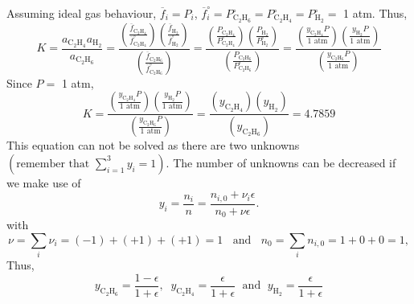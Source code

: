 \documentclass[12pts,a4paper,amsmath,amssymb,floatfix]{article}%
\newcommand{\frc}{\displaystyle\frac}
\newcommand{\summation}[3][error]{\sum\limits_{#2}^{#3}#1}
\begin{document}
\begin{enumerate}[1)]
\begin{displaymath}
         \end{displaymath}
         Assuming ideal gas behaviour, $\overline{f}_{i}=P_{i}$, $\overline{f}_{i}^{\circ}=P^{\circ}_{\text{C}_{2}\text{H}_{6}}=P^{\circ}_{\text{C}_{2}\text{H}_{4}}=P^{\circ}_{\text{H}_{2}}=$ 1 atm. Thus,
         \begin{displaymath}
            K = \frc{a_{\text{C}_{2}\text{H}_{4}}a_{\text{H}_{2}}}{a_{\text{C}_{2}\text{H}_{6}}} = \frc{\left(\frc{\overline{f}_{\text{C}_{2}\text{H}_{4}}}{\overline{f}^{\circ}_{\text{C}_{2}\text{H}_{4}}}\right)\left(\frc{\overline{f}_{\text{H}_{2}}}{\overline{f}^{\circ}_{\text{H}_{2}}}\right)}{\left(\frc{\overline{f}_{\text{C}_{2}\text{H}_{6}}}{\overline{f}^{\circ}_{\text{C}_{2}\text{H}_{6}}}\right)} = \frc{\left(\frc{P_{\text{C}_{2}\text{H}_{4}}}{P^{\circ}_{\text{C}_{2}\text{H}_{4}}}\right)\left(\frc{P_{\text{H}_{2}}}{P^{\circ}_{\text{H}_{2}}}\right)}{\left(\frc{P_{\text{C}_{2}\text{H}_{6}}}{P^{\circ}_{\text{C}_{2}\text{H}_{6}}}\right)} = \frc{\left(\frc{y_{\text{C}_{2}\text{H}_{4}}P}{1\text{ atm}}\right)\left(\frc{y_{\text{H}_{2}}P}{1\text{ atm}}\right)}{\left(\frc{y_{\text{C}_{2}\text{H}_{6}}P}{1\text{ atm}}\right)}          
         \end{displaymath}
         Since $P=$ 1 atm,
         \begin{displaymath}
            K = \frc{\left(\frc{y_{\text{C}_{2}\text{H}_{4}}P}{1\text{ atm}}\right)\left(\frc{y_{\text{H}_{2}}P}{1\text{ atm}}\right)}{\left(\frc{y_{\text{C}_{2}\text{H}_{6}}P}{1\text{ atm}}\right)} = \frc{\left(y_{\text{C}_{2}\text{H}_{4}}\right)\left(y_{\text{H}_{2}}\right)}{\left(y_{\text{C}_{2}\text{H}_{6}}\right)} = 4.7859
         \end{displaymath}
         This equation can not be solved as there are two unknowns $\left(\text{remember that }\summation[y_{i}]{i=1}{3}=1\right)$. The number of unknowns can be decreased if we make use of
         \begin{displaymath}
           y_{i} = \frc{n_{i}}{n} = \frc{n_{i,0}+\nu_{i}\epsilon}{n_{0}+\nu\epsilon}.
         \end{displaymath}
         with 
         \begin{displaymath}
            \nu = \sum\limits_{i}\nu_{i}= (-1)+(+1)+(+1)= 1 \;\;\text{ and }\;\; n_{0} = \sum\limits_{i}n_{i,0}= 1 + 0 + 0 = 1,
         \end{displaymath} 
       Thus,
         \begin{displaymath}
             y_{\text{C}_{2}\text{H}_{6}} = \frc{1-\epsilon}{1+\epsilon},\;\;y_{\text{C}_{2}\text{H}_{4}} = \frc{\epsilon}{1+\epsilon}\;\text{ and }\;y_{\text{H}_{2}} = \frc{\epsilon}{1+\epsilon}

\end{displaymath}
\end{enumerate}
\end{document}

